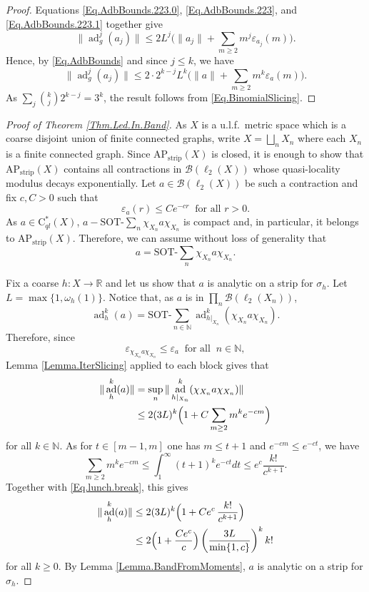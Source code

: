 \documentclass[11pt]{amsart}
\newcommand{\R}{\mathbb{R}}
\newcommand{\N}{\mathbb{N}}
\newcommand{\cB}{\mathcal{B}}
\newcommand{\eps}{\varepsilon}
\newcommand{\SOTh}{\mathrm{SOT}\text{-}}
\newcommand{\cstql}{\mathrm{C}^*_{\textit{ql}}}
\newcommand{\AP}{\mathrm{AP}}
\numberwithin{equation}{section}
\theoremstyle{definition}
\theoremstyle{remark}
\DeclareMathOperator{\ad}{ad}
\begin{document}
\begin{proof}
Equations  \eqref{Eq.AdbBounds.223.0}, \eqref{Eq.AdbBounds.223}, and \eqref{Eq.AdbBounds.223.1} together give
\[\|\ad_g^j(a_j)\|\leq 2L^j\Big(\|a_j\|+\sum_{m\geq2}m^j\eps_{a_j}(m)\Big).\]
Hence, by \eqref{Eq.AdbBounds} and since $j\leq k $, we have
\[\|\ad_g^j(a_j)\|\leq 2\cdot 2^{k-j}L^k\Big(\|a\|+\sum_{m\geq2}m^k\eps_{a}(m)\Big).\]
As $\sum_j\binom kj2^{k-j}=3^k$, the result follows from \eqref{Eq.BinomialSlicing}.
\end{proof}

\begin{proof}[Proof of Theorem \ref{Thm.Led.In.Band}]
As $X$ is a u.l.f.\ metric space which is a coarse disjoint union of finite connected graphs, write  $X=\bigsqcup_nX_n$ where each $X_n$ is a finite connected graph.
Since $\AP_{\mathrm{strip}}(X)$ is closed, it is enough to show that $ \AP_{\mathrm{strip}}(X)$ contains all contractions in $\cB(\ell_2(X))$ whose quasi-locality modulus decays exponentially. Let $a\in \cB(\ell_2(X))$ be such a contraction and fix $c,C>0$ such that
\[\eps_a(r)\leq Ce^{-cr}\ \text{ for all }r>0.\]
 As   $a\in \cstql(X)$,   $a-\SOTh\sum_n\chi_{X_n}a\chi_{X_n}$ is compact and, in particular, it belongs to $ \AP_{\mathrm{strip}}(X)$. Therefore, we can assume without loss of generality that
\[a=\SOTh\sum_n\chi_{X_n}a\chi_{X_n}.\]


Fix a coarse $h\colon X\to\R$ and let us show that $a$ is analytic on a strip for $\sigma_h$. Let $L=\max\{1,\omega_h(1)\}$. Notice that, as $a$ is in $\prod_n\cB(\ell_2(X_n))$,  \[\ad_h^k(a)=\SOTh\sum_{n\in\N}  \ad_{h|_{X_n}}^k(\chi_{X_n}a\chi_{X_n}).\] Therefore, since
\[\eps_{\chi_{X_n}a\chi_{X_n}}\leq\eps_a\ \text{ for all }\ n\in\N,\]
Lemma \ref{Lemma.IterSlicing} applied to each block gives that
\begin{align}\label{Eq.lunch.break}\|\ad_h^k(a)\| &=\sup_n\|\ad^k_{h|_{X_n}}(\chi_{X_n}a\chi_{X_n})\|\\
&\leq 2(3L)^k\Big(1+C\sum_{m\geq2}m^ke^{-cm}\Big)\notag\end{align}
for all $k\in\N$. As for  $t\in [m-1,m]$ one has $m\leq t+1$ and $  e^{-cm}\leq e^{-ct}$, we have
 \[\sum_{m\geq2}m^ke^{-cm}\leq\int_1^\infty(t+1)^ke^{-ct}dt \leq e^{c}\frac{k!}{c^{k+1}}.\]
Together with \eqref{Eq.lunch.break}, this  gives
\begin{align*}\|\ad_h^k(a)\| & \leq 2(3L)^k\Big(1+Ce^{c}\,\frac{k!}{c^{k+1}}\Big)\\
 &\leq  2\Big(1+ \frac{Ce^{c}}{c}\Big)\left(\frac{3L}{\min\{1,c\}}\right)^k k! \notag\end{align*}
 for all $k\geq 0$.
 By Lemma \ref{Lemma.BandFromMoments}, $a$ is analytic on a strip for   $\sigma_h$.
\end{proof}
\end{document}
